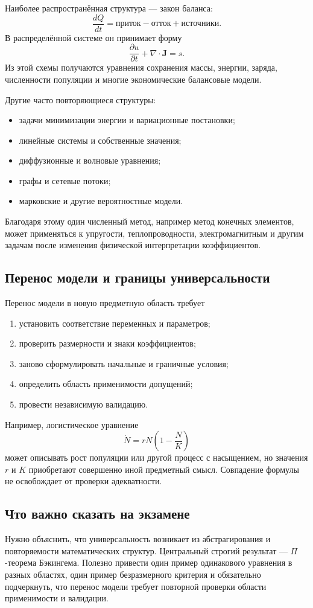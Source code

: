 Наиболее распространённая структура --- закон баланса:
\[
\boxed{
\frac{dQ}{dt}
=\text{приток}-\text{отток}+\text{источники}.
}
\]
В распределённой системе он принимает форму
\[
\frac{\partial u}{\partial t}
+\nabla\cdot\mathbf J=s.
\]
Из этой схемы получаются уравнения сохранения массы, энергии, заряда,
численности популяции и многие экономические балансовые модели.

Другие часто повторяющиеся структуры:
\begin{itemize}
    \item задачи минимизации энергии и вариационные постановки;
    \item линейные системы и собственные значения;
    \item диффузионные и волновые уравнения;
    \item графы и сетевые потоки;
    \item марковские и другие вероятностные модели.
\end{itemize}
Благодаря этому один численный метод, например метод конечных элементов,
может применяться к упругости, теплопроводности, электромагнитным и другим
задачам после изменения физической интерпретации коэффициентов.

\subsection{Перенос модели и границы универсальности}

Перенос модели в новую предметную область требует
\begin{enumerate}
    \item установить соответствие переменных и параметров;
    \item проверить размерности и знаки коэффициентов;
    \item заново сформулировать начальные и граничные условия;
    \item определить область применимости допущений;
    \item провести независимую валидацию.
\end{enumerate}

Например, логистическое уравнение
\[
\dot N=rN\left(1-\frac NK\right)
\]
может описывать рост популяции или другой процесс с насыщением, но значения
$r$ и $K$ приобретают совершенно иной предметный смысл. Совпадение формулы
не освобождает от проверки адекватности.

\subsection{Что важно сказать на экзамене}

Нужно объяснить, что универсальность возникает из абстрагирования и
повторяемости математических структур. Центральный строгий результат ---
$\Pi$-теорема Бэкингема. Полезно привести один пример одинакового уравнения
в разных областях, один пример безразмерного критерия и обязательно
подчеркнуть, что перенос модели требует повторной проверки области
применимости и валидации.

\newpage

